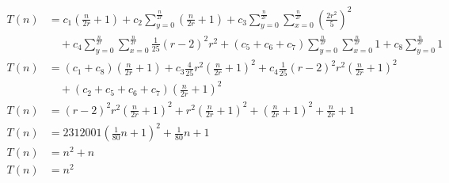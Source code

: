 \begin{subequations}
\label{eq:linedetection-clarke}
\begin{align}
\label{eq:linedetection-clarke-1}
T(n)& = c_{1} (\frac{n}{2r} + 1) + c_{2} \sum_{y=0}^{\frac{n}{2r}}
 \left(\frac{n}{2r} + 1\right) + c_3 \sum_{y=0}^{\frac{n}{2r}}
 \sum_{x=0}^{\frac{n}{2r}} (\frac{2 r^2}{5})^2 \\
& \quad + c_4 \sum_{y=0}^{\frac{n}{2r}} \sum_{x=0}^{\frac{n}{2r}} \frac{1}{25}(r - 2)^2 r^2
 + (c_{5} + c_{6} + c_{7}) \sum_{y=0}^{\frac{n}{2r}} \sum_{x=0}^{\frac{n}{2r}} 1
+ c_8 \sum_{y=0}^{\frac{n}{2r}} 1 \nonumber \\
\label{eq:linedetection-clarke-2}
T(n)& = (c_{1} + c_{8}) (\frac{n}{2r} + 1) + c_{3} \frac{4}{25} r^2 (\frac{n}{2r} + 1)^2
+ c_{4} \frac{1}{25} (r - 2)^2 r^2 (\frac{n}{2r} + 1)^2 \\
& \quad + (c_{2} + c_{5} + c_{6} + c_{7}) (\frac{n}{2r} + 1)^2 \nonumber \\
\label{eq:linedetection-clarke-3}
T(n)& = (r - 2)^2 r^2 (\frac{n}{2r} + 1)^2 + r^2 (\frac{n}{2r} + 1)^2 + (\frac{n}{2r} + 1)^2 + \frac{n}{2r} + 1 \\
\label{eq:linedetection-clarke-4}
T(n)& = 2312001 (\frac{1}{80} n + 1)^2 + \frac{1}{80} n + 1 \\
\label{eq:linedetection-clarke-5}
T(n)& = n^2+ n\\
\label{eq:linedetection-clarke-6}
T(n)& = n^2
\end{align}
\end{subequations}
